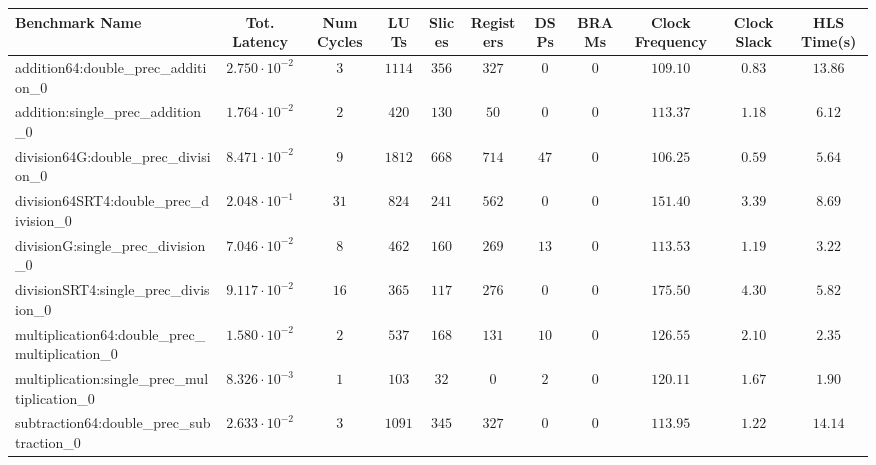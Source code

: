 \begin{tabular}{|l|c|c|c|c|c|c|c|c|c|c|}
\hline
Benchmark Name                                   & Tot. Latency            & Num Cycles & LUTs     & Slices   & Registers & DSPs   & BRAMs & Clock Frequency & Clock Slack & HLS Time(s) \\
\hline
addition64:double\_prec\_addition\_0             & $ 2.750 \cdot 10^{-2} $ & $ 3      $ & $ 1114 $ & $ 356  $ & $ 327   $ & $ 0  $ & $ 0 $ & $ 109.10      $ & $ 0.83    $ & $ 13.86   $ \\
addition:single\_prec\_addition\_0               & $ 1.764 \cdot 10^{-2} $ & $ 2      $ & $ 420  $ & $ 130  $ & $ 50    $ & $ 0  $ & $ 0 $ & $ 113.37      $ & $ 1.18    $ & $ 6.12    $ \\
division64G:double\_prec\_division\_0            & $ 8.471 \cdot 10^{-2} $ & $ 9      $ & $ 1812 $ & $ 668  $ & $ 714   $ & $ 47 $ & $ 0 $ & $ 106.25      $ & $ 0.59    $ & $ 5.64    $ \\
division64SRT4:double\_prec\_division\_0         & $ 2.048 \cdot 10^{-1} $ & $ 31     $ & $ 824  $ & $ 241  $ & $ 562   $ & $ 0  $ & $ 0 $ & $ 151.40      $ & $ 3.39    $ & $ 8.69    $ \\
divisionG:single\_prec\_division\_0              & $ 7.046 \cdot 10^{-2} $ & $ 8      $ & $ 462  $ & $ 160  $ & $ 269   $ & $ 13 $ & $ 0 $ & $ 113.53      $ & $ 1.19    $ & $ 3.22    $ \\
divisionSRT4:single\_prec\_division\_0           & $ 9.117 \cdot 10^{-2} $ & $ 16     $ & $ 365  $ & $ 117  $ & $ 276   $ & $ 0  $ & $ 0 $ & $ 175.50      $ & $ 4.30    $ & $ 5.82    $ \\
multiplication64:double\_prec\_multiplication\_0 & $ 1.580 \cdot 10^{-2} $ & $ 2      $ & $ 537  $ & $ 168  $ & $ 131   $ & $ 10 $ & $ 0 $ & $ 126.55      $ & $ 2.10    $ & $ 2.35    $ \\
multiplication:single\_prec\_multiplication\_0   & $ 8.326 \cdot 10^{-3} $ & $ 1      $ & $ 103  $ & $ 32   $ & $ 0     $ & $ 2  $ & $ 0 $ & $ 120.11      $ & $ 1.67    $ & $ 1.90    $ \\
subtraction64:double\_prec\_subtraction\_0       & $ 2.633 \cdot 10^{-2} $ & $ 3      $ & $ 1091 $ & $ 345  $ & $ 327   $ & $ 0  $ & $ 0 $ & $ 113.95      $ & $ 1.22    $ & $ 14.14   $ \\

\end{tabular}
